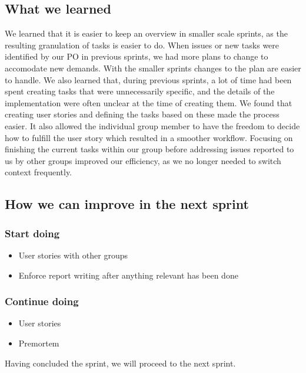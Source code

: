 \subsection{What we learned}
We learned that it is easier to keep an overview in smaller scale sprints, as the resulting granulation of tasks is easier to do. When issues or new tasks were identified by our PO in previous sprints, we had more plans to change to accomodate new demands. With the smaller sprints changes to the plan are easier to handle. 
We also learned that, during previous sprints, a lot of time had been spent creating tasks that were unnecessarily specific, and the details of the implementation were often unclear at the time of creating them. We found that creating user stories and defining the tasks based on these made the process easier. It also allowed the individual group member to have the freedom to decide how to fulfill the user story which resulted in a smoother workflow.  
Focusing on finishing the current tasks within our group before addressing issues reported to us by other groups improved our efficiency, as we no longer needed to switch context frequently.

\subsection{How we can improve in the next sprint}
\subsubsection{Start doing}
\begin{itemize}
    \item User stories with other groups
    \item Enforce report writing after anything relevant has been done
\end{itemize}
\subsubsection{Continue doing}
\begin{itemize}
    \item User stories
    \item Premortem
\end{itemize}

Having concluded the sprint, we will proceed to the next sprint.
